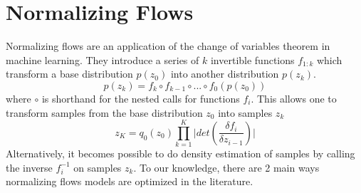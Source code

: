 


\section{Normalizing Flows}

Normalizing flows are an application of the change of variables theorem in machine learning. They introduce a series of  $k$ invertible functions $f_{1:k}$ which transform a base distribution $p(z_{0})$ into another distribution $p(z_{k})$. 
\begin{equation}
p(z_{k}) = f_{k} \circ f_{k-1} \circ ... \circ f_{0}(p(z_{0}))
\end{equation} 
where $\circ$ is shorthand for the nested calls for functions $f_{i}$. This allows one to transform samples from the base distribution $z_{0}$ into samples $z_{k}$
\begin{equation}
	z_{K} = q_{0}(z_{0}) \prod_{k=1}^{K} \bigg|det (\frac{\delta f_{i}}{\delta z_{i-1}}) \bigg|
\end{equation}
Alternatively, it becomes possible to do density estimation of samples by calling the inverse $f_{i}^{-1}$ on samples $z_{k}$. To our knowledge, there are 2 main ways normalizing flows models are optimized in the literature. 

